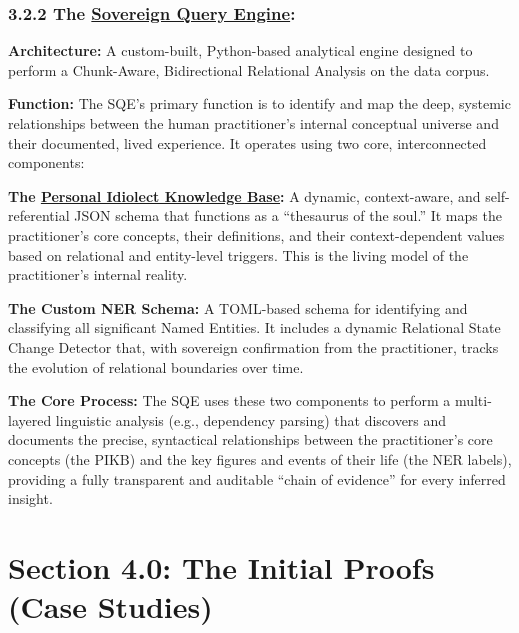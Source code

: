 \documentclass{article}
\begin{document}
\subsubsection*{3.2.2 The \hyperlink{gloss:sovereign_query_engine}{Sovereign Query Engine}:}
\begin{description}
    \item \textbf{Architecture:} A custom-built, Python-based analytical engine designed to perform a Chunk-Aware, Bidirectional Relational Analysis on the data corpus.
    \item \textbf{Function:} The SQE's primary function is to identify and map the deep, systemic relationships between the human practitioner's internal conceptual universe and their documented, lived experience. It operates using two core, interconnected components:
    \item \textbf{The \hyperlink{gloss:pikb}{Personal Idiolect Knowledge Base}:} A dynamic, context-aware, and self-referential JSON schema that functions as a ``thesaurus of the soul.'' It maps the practitioner's core concepts, their definitions, and their context-dependent values based on relational and entity-level triggers. This is the living model of the practitioner's internal reality.
    \item \textbf{The Custom NER Schema:} A TOML-based schema for identifying and classifying all significant Named Entities. It includes a dynamic Relational State Change Detector that, with sovereign confirmation from the practitioner, tracks the evolution of relational boundaries over time.
    \item \textbf{The Core Process:} The SQE uses these two components to perform a multi-layered linguistic analysis (e.g., dependency parsing) that discovers and documents the precise, syntactical relationships between the practitioner's core concepts (the PIKB) and the key figures and events of their life (the NER labels), providing a fully transparent and auditable ``chain of evidence'' for every inferred insight.
\end{description}




\section*{Section 4.0: The Initial Proofs (Case Studies)}
\end{document}

